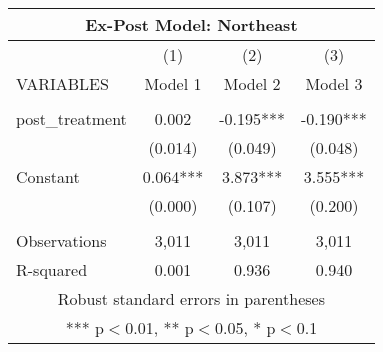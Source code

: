 \begin{tabular}{lccc}
\multicolumn{4}{c}{Ex-Post Model: Northeast} \\ \hline
 & (1) & (2) & (3) \\
VARIABLES & Model 1 & Model 2 & Model 3 \\ \hline
 &  &  &  \\
post\_treatment & 0.002 & -0.195*** & -0.190*** \\
 & (0.014) & (0.049) & (0.048) \\
Constant & 0.064*** & 3.873*** & 3.555*** \\
 & (0.000) & (0.107) & (0.200) \\
 &  &  &  \\
Observations & 3,011 & 3,011 & 3,011 \\
 R-squared & 0.001 & 0.936 & 0.940 \\ \hline
\multicolumn{4}{c}{ Robust standard errors in parentheses} \\
\multicolumn{4}{c}{ *** p$<$0.01, ** p$<$0.05, * p$<$0.1} \\
\end{tabular}
